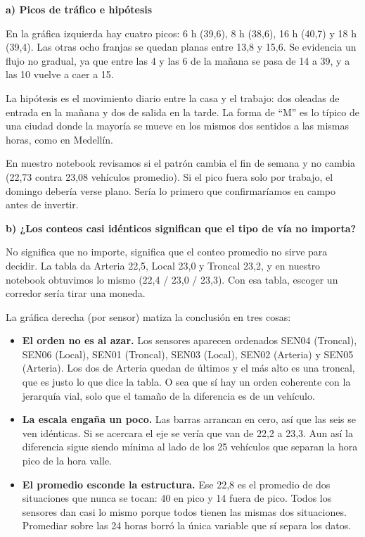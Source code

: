 \documentclass[11pt]{article}
\begin{document}
\begin{respuesta}[Respuesta 3.C]
\noindent\textbf{a) Picos de tráfico e hipótesis}

En la gráfica izquierda hay cuatro picos: 6 h (39,6), 8 h (38,6), 16 h (40,7) y 18 h (39,4). Las otras ocho franjas se quedan planas entre 13,8 y 15,6. Se evidencia un flujo no gradual, ya que entre las 4 y las 6 de la mañana se pasa de 14 a 39, y a las 10 vuelve a caer a 15.

La hipótesis es el movimiento diario entre la casa y el trabajo: dos oleadas de entrada en la mañana y dos de salida en la tarde. La forma de ``M'' es lo típico de una ciudad donde la mayoría se mueve en los mismos dos sentidos a las mismas horas, como en Medellín.

En nuestro notebook revisamos si el patrón cambia el fin de semana y no cambia (22,73 contra 23,08 vehículos promedio). Si el pico fuera solo por trabajo, el domingo debería verse plano. Sería lo primero que confirmaríamos en campo antes de invertir.

\medskip
\noindent\textbf{b) ¿Los conteos casi idénticos significan que el tipo de vía no importa?}

No significa que no importe, significa que el conteo promedio no sirve para decidir. La tabla da Arteria 22,5, Local 23,0 y Troncal 23,2, y en nuestro notebook obtuvimos lo mismo (22,4 / 23,0 / 23,3). Con esa tabla, escoger un corredor sería tirar una moneda.

La gráfica derecha (por sensor) matiza la conclusión en tres cosas:

\begin{itemize}[leftmargin=1.3em]
  \item \textbf{El orden no es al azar.} Los sensores aparecen ordenados SEN04 (Troncal), SEN06 (Local), SEN01 (Troncal), SEN03 (Local), SEN02 (Arteria) y SEN05 (Arteria). Los dos de Arteria quedan de últimos y el más alto es una troncal, que es justo lo que dice la tabla. O sea que sí hay un orden coherente con la jerarquía vial, solo que el tamaño de la diferencia es de un vehículo.
  \item \textbf{La escala engaña un poco.} Las barras arrancan en cero, así que las seis se ven idénticas. Si se acercara el eje se vería que van de 22,2 a 23,3. Aun así la diferencia sigue siendo mínima al lado de los 25 vehículos que separan la hora pico de la hora valle.
  \item \textbf{El promedio esconde la estructura.} Ese 22,8 es el promedio de dos situaciones que nunca se tocan: 40 en pico y 14 fuera de pico. Todos los sensores dan casi lo mismo porque todos tienen las mismas dos situaciones. Promediar sobre las 24 horas borró la única variable que sí separa los datos.
\end{itemize}


\end{respuesta}
\end{document}
